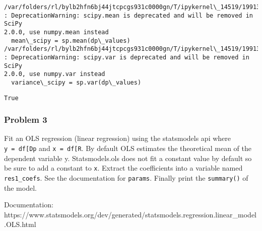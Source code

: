 \documentclass[11pt]{article}
\makeatletter
\newcommand{\boxspacing}{\kern\kvtcb@left@rule\kern\kvtcb@boxsep}
\newcommand{\prompt}[4]{
        {\ttfamily\llap{{\color{#2}[#3]:\hspace{3pt}#4}}\vspace{-\baselineskip}}
    }
\makeatother
\begin{document}
    \begin{Verbatim}[commandchars=\\\{\}]
/var/folders/rl/bylb2hfn6bj44jtcpcgs931c0000gn/T/ipykernel\_14519/1991367081.py:7
: DeprecationWarning: scipy.mean is deprecated and will be removed in SciPy
2.0.0, use numpy.mean instead
  mean\_scipy = sp.mean(dp\_values)
/var/folders/rl/bylb2hfn6bj44jtcpcgs931c0000gn/T/ipykernel\_14519/1991367081.py:8
: DeprecationWarning: scipy.var is deprecated and will be removed in SciPy
2.0.0, use numpy.var instead
  variance\_scipy = sp.var(dp\_values)
    \end{Verbatim}

            \begin{tcolorbox}[breakable, size=fbox, boxrule=.5pt, pad at break*=1mm, opacityfill=0]
\prompt{Out}{outcolor}{27}{\boxspacing}
\begin{Verbatim}[commandchars=\\\{\}]
True
\end{Verbatim}
\end{tcolorbox}
        
    \hypertarget{problem-3}{%
\subsubsection{Problem 3}\label{problem-3}}

Fit an OLS regression (linear regression) using the statsmodels api
where \texttt{y\ =\ df{[}\textquotesingle{}Dp\textquotesingle{}{]}} and
\texttt{x\ =\ df{[}\textquotesingle{}R\textquotesingle{}{]}}. By default
OLS estimates the theoretical mean of the dependent variable y.
Statsmodels.ols does not fit a constant value by default so be sure to
add a constant to \texttt{x}. Extract the coefficients into a variable
named \texttt{res1\_coefs}. See the documentation for \texttt{params}.
Finally print the \texttt{summary()} of the model.

Documentation:
https://www.statsmodels.org/dev/generated/statsmodels.regression.linear\_model.OLS.html
\end{document}
